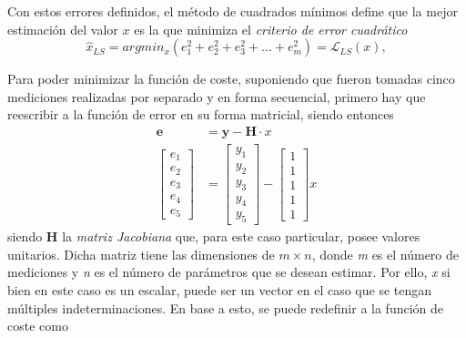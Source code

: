Con estos errores definidos, el método de cuadrados mínimos define que la mejor estimación del valor $x$ es la que minimiza el \textit{criterio de error cuadrático}
\begin{equation}
    \hat{x}_{LS} = argmin_x(e_1^2+e_2^2+e_3^2+...+e_m^2) = \mathscr{L}_{LS}(x),
    \label{eq:squarederrorcriterion}
\end{equation}


% 

Para poder minimizar la función de coste, suponiendo que fueron tomadas cinco mediciones realizadas por separado y en forma secuencial, primero hay que reescribir a la función de error en su forma matricial, siendo entonces
\begin{align}
    \bm{e} &= \bm{y} - \bm{H}\cdot x \\
    \begin{bmatrix}
        e_1\\ e_2\\ e_3\\ e_4\\ e_5
    \end{bmatrix}
    &= 
    \begin{bmatrix}
        y_1\\ y_2\\ y_3\\ y_4\\ y_5
    \end{bmatrix}
    -
    \begin{bmatrix}
        1\\ 1\\ 1\\ 1\\ 1
    \end{bmatrix}
    x
\end{align}
siendo $\bm{H}$ la \textit{matriz Jacobiana} que, para este caso particular, posee valores unitarios. Dicha matriz tiene las dimensiones de $m\times n$, donde \textit{m} es el número de mediciones y \textit{n} es el número de parámetros que se desean estimar. Por ello, \textit{x} si bien en este caso es un escalar, puede ser un vector en el caso que se tengan múltiples indeterminaciones. En base a esto, se puede redefinir a la función de coste como

